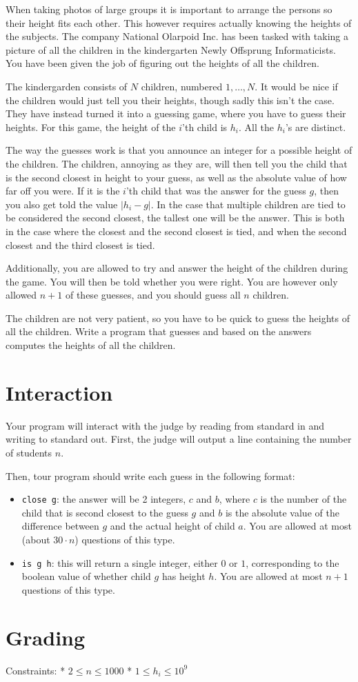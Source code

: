 When taking photos of large groups it is important to arrange the persons so their height fits each other.
This however requires actually knowing the heights of the subjects.
The company National Olarpoid Inc. has been tasked with taking a picture of all the children in the kindergarten Newly Offsprung Informaticists.
You have been given the job of figuring out the heights of all the children.

The kindergarden consists of $N$ children, numbered $1, \ldots, N$.
It would be nice if the children would just tell you their heights, though sadly this isn't the case.
They have instead turned it into a guessing game, where you have to guess their heights.
For this game, the height of the $i$'th child is $h_i$.
All the $h_i$'s are distinct.

The way the guesses work is that you announce an integer for a possible height of the children.
The children, annoying as they are, will then tell you the child that is the second closest in height to your guess, as well as the absolute value of how far off you were.
If it is the $i$'th child that was the answer for the guess $g$, then you also get told the value $|h_i - g|$.
In the case that multiple children are tied to be considered the second closest, the tallest one will be the answer.
This is both in the case where the closest and the second closest is tied, and when the second closest and the third closest is tied.

Additionally, you are allowed to try and answer the height of the children during the game.
You will then be told whether you were right.
You are however only allowed $n+1$ of these guesses, and you should guess all $n$ children.

The children are not very patient, so you have to be quick to guess the heights of all the children.
Write a program that guesses and based on the answers computes the heights of all the children.

\section*{Interaction}
Your program will interact with the judge by reading from standard in and writing to standard out.
First, the judge will output a line containing the number of students $n$.

Then, tour program should write each guess in the following format:
\begin{itemize}
\item \texttt{close g}: the answer will be 2 integers, $c$ and $b$, where $c$ is the number of the child that is second closest to the guess $g$ and $b$ is the absolute value of the difference between $g$ and the actual height of child $a$.
You are allowed at most (about $30 \cdot n$) questions of this type.
\item \texttt{is g h}: this will return a single integer, either $0$ or $1$, corresponding to the boolean value of whether child $g$ has height $h$. You are allowed at most $n+1$ questions of this type.
\end{itemize}

\section*{Grading}
Constraints:
  * $2 \le n \le 1000$
  * $1 \le h_i \le 10^9$
